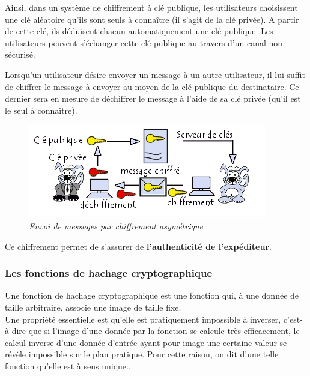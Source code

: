 \documentclass[conference]{IEEEtran}
\begin{document}
Ainsi, dans un système de chiffrement à clé publique, les utilisateurs choisissent une clé aléatoire qu'ils sont seuls à connaître (il s'agit de la clé privée). A partir de cette clé, ils déduisent chacun automatiquement une clé publique. Les utilisateurs peuvent s'échanger cette clé publique au travers d'un canal non sécurisé.

Lorsqu'un utilisateur désire envoyer un message à un autre utilisateur, il lui suffit de chiffrer le message à envoyer au moyen de la clé publique du destinataire. Ce dernier sera en mesure de déchiffrer le message à l'aide de sa clé privée (qu'il est le seul à connaître). \cite{ccmasym}

\begin{figure}[!h]
    \centering
    \includegraphics[scale=0.7]{asym.PNG}
    \caption{\textit{Envoi de messages par chiffrement asymétrique} \cite{ccmasym}}
    \label{fig:asym}
\end{figure}

Ce chiffrement permet de s'assurer de \textbf{l'authenticité de l'expéditeur}. \cite{wikiasym}\\
\subsubsection{Les fonctions de hachage cryptographique}
Une fonction de hachage cryptographique est une fonction qui, à une donnée de taille arbitraire, associe une image de taille fixe. \\Une propriété essentielle est qu'elle est pratiquement impossible à inverser, c'est-à-dire que si l'image d'une donnée par la fonction se calcule très efficacement, le calcul inverse d'une donnée d'entrée ayant pour image une certaine valeur se révèle impossible sur le plan pratique. Pour cette raison, on dit d'une telle fonction qu'elle est à sens unique.\cite{wikihash, ryxhash}.
\end{document}
